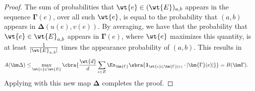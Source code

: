 \begin{proof}
    The sum of probabilities that $\wt{e}\in (\wt{E})_{a,b}$ appears in the sequence $\bm\Gamma(e)$, over all such $\wt{e}$, is equal to the probability that $(a,b)$ appears in $\bm\Delta(u(e),v(e))$. By averaging, we have that the probability that $\wt{e}\in \wt{E}_{a,b}$ appears in $\bm\Gamma(e)$, where $\wt{e}$ maximizes this quantity, is at least $\frac1{|\wt{E}_{a,b}|}$ times the appearance probability of $(a,b)$. This results in
    \begin{align*}
        A(\bm\Delta)\leq&\max_{\wt{e}\in \wt{E}} \cbra{\frac{\wt{d}}{d}\sum_{e\in E}\Ex_{\bm{\Gamma}}\sbra{\mathbf{1}_{\wt{e} \in \bm{\Gamma}(e)}\cdot |\bm{\Gamma}(e)|} }=B(\bm\Gamma).
    \end{align*}
    Applying  with this new map $\bm\Delta$ completes the proof.
\end{proof}

